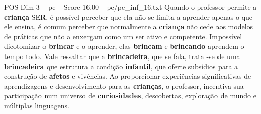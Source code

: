 \begin{textsample}{POS Dim 3 – pe – Score 16.00 – pe/pe\_inf\_16.txt}
Quando o professor permite a \textbf{criança} SER, é possível perceber que ela não se limita a aprender apenas o que ele ensina, é comum perceber que normalmente a \textbf{criança} não cede aos modelos de práticas que não a enxergam como um ser ativo e competente.
Impossível dicotomizar o \textbf{brincar} e o aprender, elas \textbf{brincam} e \textbf{brincando} aprendem o tempo todo.
Vale ressaltar que a \textbf{brincadeira}, que se fala, trata -se de uma \textbf{brincadeira} que estrutura a condição \textbf{infantil}, que oferte subsídios para a construção de \textbf{afetos} e vivências.
Ao proporcionar experiências significativas de aprendizagens e desenvolvimento para as \textbf{crianças}, o professor, incentiva sua participação num universo de \textbf{curiosidades}, descobertas, exploração de mundo e múltiplas linguagens.

\end{textsample}
